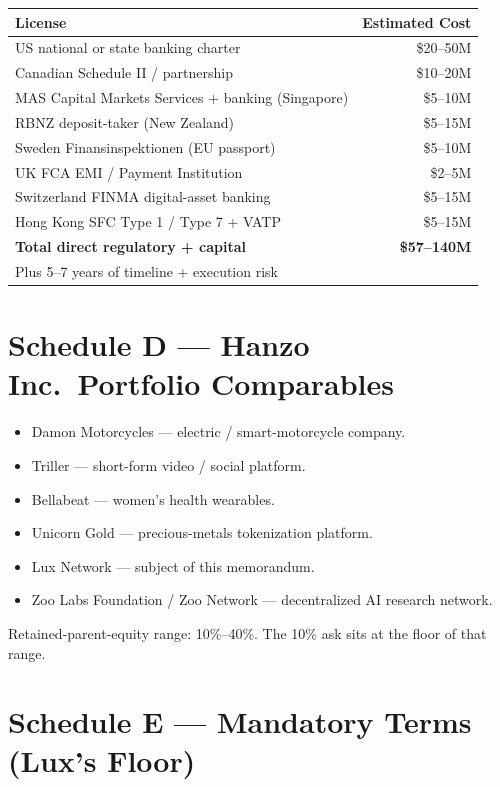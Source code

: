 \documentclass[11pt,letterpaper]{article}
\begin{document}
\begin{center}
\begin{tabular}{lr}
\toprule
\textbf{License} & \textbf{Estimated Cost} \\
\midrule
US national or state banking charter & \$20--50M \\
Canadian Schedule II / partnership & \$10--20M \\
MAS Capital Markets Services + banking (Singapore) & \$5--10M \\
RBNZ deposit-taker (New Zealand) & \$5--15M \\
Sweden Finansinspektionen (EU passport) & \$5--10M \\
UK FCA EMI / Payment Institution & \$2--5M \\
Switzerland FINMA digital-asset banking & \$5--15M \\
Hong Kong SFC Type 1 / Type 7 + VATP & \$5--15M \\
\midrule
\textbf{Total direct regulatory + capital} & \textbf{\$57--140M} \\
Plus 5--7 years of timeline + execution risk & \\
\bottomrule
\end{tabular}
\end{center}

\section*{Schedule D --- Hanzo Inc.\ Portfolio Comparables}

\begin{itemize}[leftmargin=1.5em,itemsep=0.1em]
\item Damon Motorcycles --- electric / smart-motorcycle company.
\item Triller --- short-form video / social platform.
\item Bellabeat --- women's health wearables.
\item Unicorn Gold --- precious-metals tokenization platform.
\item Lux Network --- subject of this memorandum.
\item Zoo Labs Foundation / Zoo Network --- decentralized AI research network.
\end{itemize}

Retained-parent-equity range: 10\%--40\%. The 10\% ask sits at the
floor of that range.

\section*{Schedule E --- Mandatory Terms (Lux's Floor)}
\end{document}

